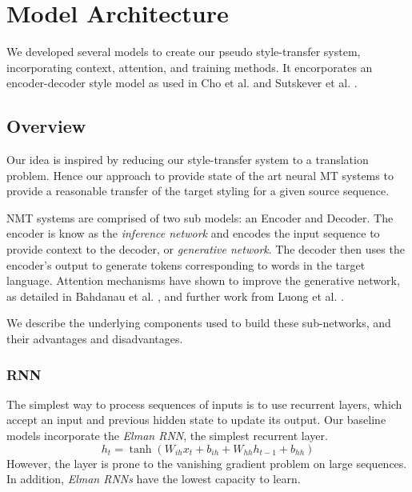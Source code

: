 \documentclass[twoside,twocolumn]{article}
\begin{document}
\section{Model Architecture}
\label{sec:models}
We developed several models to create our pseudo style-transfer system,
incorporating context, attention, and training methods. It encorporates
an encoder-decoder style model as used in Cho et al. \cite{cho2014learning}
and Sutskever et al. \cite{sutskever2014sequence}.
\subsection{Overview}
Our idea is inspired by reducing our style-transfer system to a translation
problem. Hence our approach to provide state of the art neural MT systems to
provide a reasonable transfer of the target styling for a given source sequence.

NMT systems are comprised of two sub models: an Encoder and Decoder. The
encoder is know as the \emph{inference network} and encodes the input sequence
to provide context to the decoder, or \emph{generative network}. The decoder
then uses the encoder's output to generate tokens corresponding to words
in the target language. Attention mechanisms have shown to improve the
generative network, as detailed in Bahdanau et al. \cite{bahdanau2014neural},
and further work from Luong et al. \cite{luong2015effective}.

We describe the underlying components used to build these sub-networks, and
their advantages and disadvantages.
\subsubsection{RNN}
The simplest way to process sequences of inputs is to use recurrent layers,
which accept an input and previous hidden state to update its output.
Our baseline models incorporate the \emph{Elman RNN}, the simplest recurrent
layer.
\begin{equation}
  \label{eq:rnn}
  h_t = \tanh(W_{ih} x_t + b_{ih}  +  W_{hh} h_{t-1} + b_{hh})
\end{equation}
However, the layer is prone to the vanishing gradient problem
on large sequences. In addition, \emph{Elman RNNs} have the lowest capacity
to learn.
\end{document}

